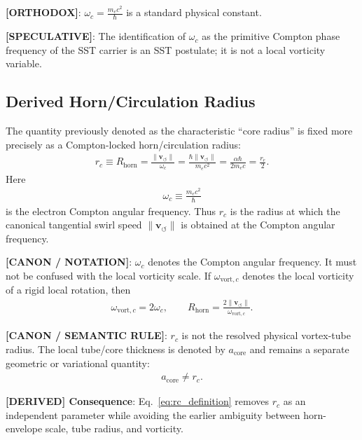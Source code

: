 \documentclass[11pt]{article}
\theoremstyle{definition}
\theoremstyle{plain}
\theoremstyle{remark}
\newcommand{\rc}{{r_c}}
\newcommand{\vnorm}{\lVert \mathbf{v}_{\!\boldsymbol{\circlearrowleft}} \rVert}
\begin{document}
        \textbf{[ORTHODOX]}: $\omega_c = \frac{m_e c^2}{\hbar}$ is a standard physical constant.
        
        \textbf{[SPECULATIVE]}: The identification of $\omega_c$ as the primitive Compton phase frequency of the SST carrier is an SST postulate; it is not a local vorticity variable.
    
    \subsection{Derived Horn/Circulation Radius}
        \label{subsec:derived_horn_circulation_radius}

        The quantity previously denoted as the characteristic ``core radius'' is fixed more precisely as a
        Compton-locked horn/circulation radius:
        \begin{align}
            \rc \equiv R_{\mathrm{horn}}
            = \frac{\vnorm}{\omega_c}
            = \frac{\hbar\vnorm}{m_e c^2}
            = \frac{\alpha\hbar}{2m_e c}
            = \frac{r_e}{2}.
            \label{eq:rc_definition}
        \end{align}
        Here
        \begin{align}
            \omega_c \equiv \frac{m_e c^2}{\hbar}
            \label{eq:omega_c_compton}
        \end{align}
        is the electron Compton angular frequency. Thus $\rc$ is the radius at which the canonical
        tangential swirl speed $\vnorm$ is obtained at the Compton angular frequency.

        \textbf{[CANON / NOTATION]}: $\omega_c$ denotes the Compton angular frequency. It must not be confused with the local vorticity scale. If $\omega_{\mathrm{vort},c}$ denotes the local vorticity of a rigid local rotation, then
        \begin{align}
            \omega_{\mathrm{vort},c}=2\omega_c,
            \qquad
            R_{\mathrm{horn}}=\frac{2\vnorm}{\omega_{\mathrm{vort},c}}.
        \end{align}

        \textbf{[CANON / SEMANTIC RULE]}: $\rc$ is not the resolved physical vortex-tube radius. The local tube/core thickness is denoted by $a_{\mathrm{core}}$ and remains a separate geometric or variational quantity:
        \begin{align}
            a_{\mathrm{core}} \neq \rc.
        \end{align}

        \textbf{[DERIVED] Consequence}: Eq.~\eqref{eq:rc_definition} removes $\rc$ as an independent parameter while avoiding the earlier ambiguity between horn-envelope scale, tube radius, and vorticity.
    
\end{document}
